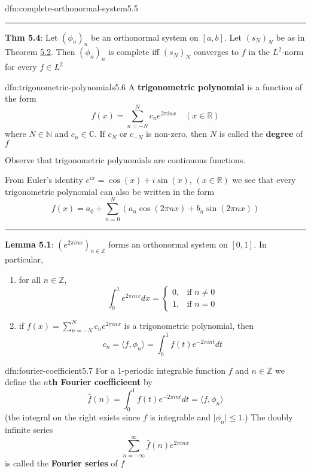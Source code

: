 \documentclass[landscape, 8pt]{extarticle}
\begin{document}
\begin{multicols}{3}
\begin{dfn}{dfn:complete-orthonormal-system}{5.5}
	\vspace{-5pt}
	\noindent\rule{\textwidth}{0.2pt}
	\textbf{Thm 5.4}: Let $(\phi_{n})_{n}$ be an orthonormal system on $[a, b]$. Let $(s_{N})_{N}$ be as in Theorem \hyperref[dfn:inner-prod]{5.2}. Then $(\phi_{n})_{n}$ is complete iff $(s_{N})_{N}$ converges to $f$ in the $L^{2}$-norm for every $f\in L^{2}$
\end{dfn}

\vspace{-5pt}
\begin{dfn}{dfn:trigonometric-polynomials}{5.6}
	A \textbf{trigonometric polynomial} is a function of the form
	\[f(x) = \sum_{n = -N}^{N} c_{n} e^{2 \pi inx} \quad (x\in\mathbb{R})\]
	where $N\in\mathbb{N}$ and $c_{n}\in\mathbb{C}$. If $c_{N}$ or $c_{-N}$ is non-zero, then $N$ is called the \textbf{degree} of $f$

	Observe that trigonometric polynomials are continuous functions.

	From Euler's identity $e^{ix} = \cos(x) + i\sin(x),\, (x\in \mathbb{R})$ we see that every trigonometric polynomial can also be written in the form
	\vspace{-3pt}
	\[ f(x) = a_{0} + \sum_{n = 0}^{N}(a_{n} \cos(2\pi nx) + b_{n}\sin(2 \pi nx))\]

	\vspace{-2pt}
	\noindent\rule{\textwidth}{0.2pt}
	\textbf{Lemma 5.1}: $(e^{2 \pi inx})_{n\in \mathbb{Z}}$ forms an orthonormal system on $[0, 1]$. In particular,
	\vspace{-3pt}
	\begin{enumerate}[leftmargin=*]
	    \item for all $n\in \mathbb{Z}$,
			\[\int_{0}^{1} e^{2 \pi inx} dx = \begin{cases}
				0, & \text{if $n\ne 0$} \\
				1, & \text{if $n = 0$}
			\end{cases}\]
		\item if $f(x) = \sum_{n = -N}^{N} c_{n}e^{2 \pi inx}$ is a trigonometric polynomial, then
			\[c_{n} = \langle f, \phi_{n} \rangle = \int_{0}^{1} f(t) e^{-2 \pi i n t} dt\]
	\end{enumerate}
\end{dfn}

\begin{dfn}{dfn:fourier-coefficient}{5.7}
	For a $1$-periodic integrable function $f$ and $n\in \mathbb{Z}$ we define the \textbf{$n$th Fourier coefficieent} by
	\[\widehat{f}(n) = \int_{0}^{1} f(t)e^{-2 \pi i n t} dt = \langle f, \phi_{n} \rangle\]
	(the integral on the right exists since $f$ is integrable and $\lvert \phi_{n} \rvert \le 1$.) The doubly infinite series
	\[\sum_{n = -\infty}^{\infty} \widehat{f}(n) e^{2 \pi i n x}\]
	is called the \textbf{Fourier series} of $f$


\end{dfn}
\end{multicols}
\end{document}

